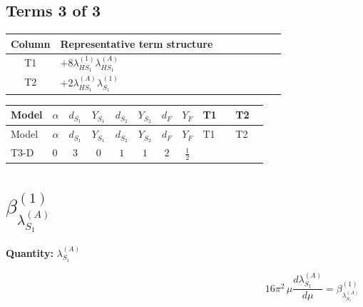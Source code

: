 \documentclass[8pt]{article}
\begin{document}
\begin{landscape}
\subsection*{Terms 3 of 3}
\begin{center}
\begin{tabular}{@{}c >{\raggedright\arraybackslash}p{0.82\linewidth}@{}}
\toprule
Column & Representative term structure \\
\midrule
T1 & \(\displaystyle +8 {\lambda_{HS_1}^{(1)}} {\lambda_{HS_1}^{(A)}}\) \\
\midrule
T2 & \(\displaystyle +2 {\lambda_{HS_1}^{(A)}} {\lambda_{S_1}^{(1)}}\) \\
\midrule
\bottomrule
\end{tabular}
\end{center}
\smallskip
\tiny
\begin{longtable}{@{}llcccccc >{\raggedright\arraybackslash}p{0.21\linewidth} >{\raggedright\arraybackslash}p{0.21\linewidth}@{}}
\toprule
Model & $\alpha$ & $d_{S_1}$ & $Y_{S_1}$ & $d_{S_2}$ & $Y_{S_2}$ & $d_F$ & $Y_F$ & T1 & T2 \\
\midrule
\endfirsthead
\toprule
Model & $\alpha$ & $d_{S_1}$ & $Y_{S_1}$ & $d_{S_2}$ & $Y_{S_2}$ & $d_F$ & $Y_F$ & T1 & T2 \\
\midrule
\endhead
T3-D & $0$ & $3$ & $0$ & $1$ & $1$ & $2$ & $\frac{1}{2}$ & \scriptsize\adjustbox{max width=\linewidth}{$\begin{gathered} +8 {\lambda_{HS_1}^{(1)}} {\lambda_{HS_1}^{(A)}}\end{gathered}$} & \scriptsize\adjustbox{max width=\linewidth}{$\begin{gathered} +2 {\lambda_{HS_1}^{(A)}} {\lambda_{S_1}^{(1)}}\end{gathered}$} \\
\midrule
\bottomrule
\end{longtable}
\clearpage
\section*{$\beta_{\lambda_{S_1}^{(A)}}^{(1)}$}
\noindent\textbf{Quantity: }$\lambda_{S_1}^{(A)}$\par\smallskip
\[16\pi^2\,\mu\frac{d \lambda_{S_1}^{(A)}}{d\mu}=\beta_{\lambda_{S_1}^{(A)}}^{(1)}\]

\end{landscape}
\end{document}
